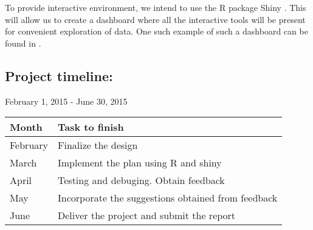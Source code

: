 \documentclass[12pt]{article}
\begin{document}


To provide interactive environment, we intend to use the R \cite{R} package Shiny \cite{shiny}. This will allow us to create a dashboard where all the interactive tools will be present for convenient exploration of data. One such example of such a dashboard can be found in \cite{shinyapp}.

\subsection{Project timeline:} February 1, 2015 - June 30, 2015


\begin{table}[h]
\begin{tabular}{ll}
Month & Task to finish \\
\hline
February	& Finalize the design \\
March	& Implement the plan using R and shiny \\
April	        & Testing and debuging. Obtain feedback \\
May	& Incorporate the suggestions obtained from feedback \\
June	& Deliver the project and submit the report \\
\hline
\end{tabular}
\end{table}


\end{document}
